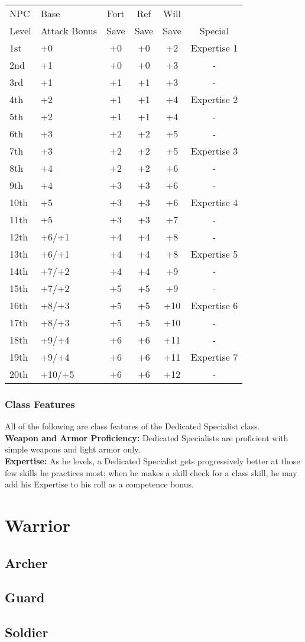 \documentclass[11pt]{report}
\begin{document}
\begin{tabular}{llcccc}
\hline
NPC & Base & Fort & Ref & Will & \\
Level & Attack Bonus & Save & Save & Save & Special \\
\hline

	1st & +0 & +0 & +0 & +2 & Expertise 1 \\
\tblbg	2nd & +1 & +0 & +0 & +3 & - \\
	3rd & +1 & +1 & +1 & +3 & - \\
\tblbg	4th & +2 & +1 & +1 & +4 & Expertise 2 \\
	5th & +2 & +1 & +1 & +4 & - \\
\tblbg	6th & +3 & +2 & +2 & +5 & - \\
	7th & +3 & +2 & +2 & +5 & Expertise 3 \\
\tblbg	8th & +4 & +2 & +2 & +6 & - \\
	9th & +4 & +3 & +3 & +6 & - \\
\tblbg	10th & +5 & +3 & +3 & +6 & Expertise 4 \\
	11th & +5 & +3 & +3 & +7 & - \\
\tblbg	12th & +6/+1 & +4 & +4 & +8 & - \\
	13th & +6/+1 & +4 & +4 & +8 & Expertise 5 \\
\tblbg	14th & +7/+2 & +4 & +4 & +9 & - \\
	15th & +7/+2 & +5 & +5 & +9 & - \\
\tblbg	16th & +8/+3 & +5 & +5 & +10 & Expertise 6 \\
	17th & +8/+3 & +5 & +5 & +10 & - \\
\tblbg	18th & +9/+4 & +6 & +6 & +11 & - \\
	19th & +9/+4 & +6 & +6 & +11 & Expertise 7 \\
\tblbg	20th & +10/+5 & +6 & +6 & +12 & - \\
\hline
\end{tabular}

\subsubsection{Class Features}
All of the following are class features of the Dedicated Specialist class. \\
\textbf{Weapon and Armor Proficiency:} Dedicated Specialists are proficient with
simple weapons and light armor only. \\
\textbf{Expertise:} As he levels, a Dedicated Specialist gets progressively
better at those few skills he practices most; when he makes a skill check for a
class skill, he may add his Expertise to his roll as a competence bonus.

\section{Warrior}
\subsection{Archer}
\subsection{Guard}
\subsection{Soldier}
\end{document}

